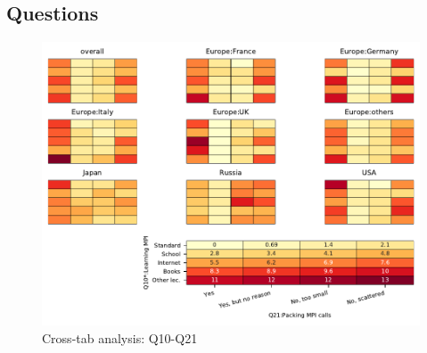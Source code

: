 
\subsection{Questions}


\begin{figure}
\begin{center}
\includegraphics[width=12cm]{../pdfs/Q10-Q21.pdf}
\caption{Cross-tab analysis: Q10-Q21}
\label{fig:Q10-Q21}
\end{center}
\end{figure}
